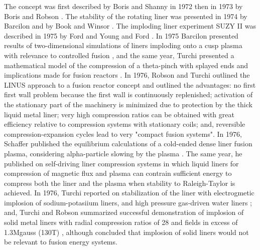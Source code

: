 The concept was first described by Boris and Shanny in 1972 \cite{Boris1972} \cite{Boris1972a} then in 1973 by Boris \cite{Boris1973} and Robson \cite{Robson1973}.  The stability of the rotating liner was presented in 1974 by Barcilon \cite{Barcilon1974} and by Book and Winsor \cite{Book1974}.  The imploding liner experiment SUZY II was described in 1975 by Ford \cite{Ford1974} and Young and Ford \cite{Young1974}. In 1975 Barcilon presented results of two-dimensional simulations of liners imploding onto a cusp plasma with relevance to controlled fusion \cite{Barcilon1975}, and the same year, Turchi presented a mathematical model of the compression of a theta-pinch with splayed ends and implications made for fusion reactors \cite{Turchi1975}.  In 1976, Robson and Turchi \cite{Robson1976} outlined the LINUS approach to a fusion reactor concept and outlined the advantages: no first first wall problem because the first wall is continuously replenished; activation of the stationary part of the machinery is minimized due to protection by the thick liquid metal liner; very high compression ratios can be obtained with great efficiency relative to compression systems with stationary coils; and, reversible compression-expansion cycles lead to very "compact fusion systems". In 1976, Schaffer published the equilibrium calculations of a cold-ended dense liner fusion plasma, considering alpha-particle slowing by the plasma \cite{Schaffer1976}.  The same year, he published on self-driving liner compression systems \cite{Schaffer1976a} in which liquid liners for compression of magnetic flux and plasma can contrain sufficient energy to compress both the liner and the plasma when stability to Raleigh-Taylor is achieved. In 1976, Turchi reported on stabilization of the liner with electrogmetic implosion of sodium-potasiium liners, and high pressure gas-driven water liners \cite{Turchi1976}; and, Turchi and Robson summarized successful demonstration of implosion of solid metal liners with radial compression ratios of 28 and fields in excess of 1.3Mgauss (130T) \cite{Turchi1976a}, although concluded that implosion of solid liners would not be relevant to fusion energy systems.  \\

